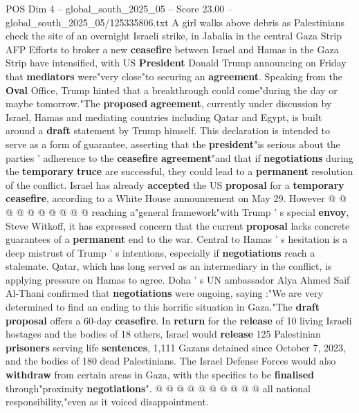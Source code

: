 \begin{textsample}{POS Dim 4 – global\_south\_2025\_05 – Score 23.00 – global\_south\_2025\_05/125335806.txt}  \label{ex:f4_pos_093}
A girl walks above debris as Palestinians check the site of an overnight Israeli strike, in Jabalia in the central Gaza Strip AFP Efforts to broker a new \textbf{ceasefire} between Israel and Hamas in the Gaza Strip have intensified, with US \textbf{President} Donald Trump announcing on Friday that \textbf{mediators} were"very close"to securing an \textbf{agreement}.
Speaking from the \textbf{Oval} Office, Trump hinted that a breakthrough could come"during the day or maybe tomorrow."The \textbf{proposed} \textbf{agreement}, currently under discussion by Israel, Hamas and mediating countries including Qatar and Egypt, is built around a \textbf{draft} statement by Trump himself.
This declaration is intended to serve as a form of guarantee, asserting that the \textbf{president}"is serious about the parties ' adherence to the \textbf{ceasefire} \textbf{agreement}"and that if \textbf{negotiations} during the \textbf{temporary} \textbf{truce} are successful, they could lead to a \textbf{permanent} resolution of the conflict.
Israel has already \textbf{accepted} the US \textbf{proposal} for a \textbf{temporary} \textbf{ceasefire}, according to a White House announcement on May 29.
However @ @ @ @ @ @ @ @ @ @ reaching a"general framework"with Trump ' s special \textbf{envoy}, Steve Witkoff, it has expressed concern that the current \textbf{proposal} lacks concrete guarantees of a \textbf{permanent} end to the war.
Central to Hamas ' s hesitation is a deep mistrust of Trump ' s intentions, especially if \textbf{negotiations} reach a stalemate.
Qatar, which has long served as an intermediary in the conflict, is applying pressure on Hamas to agree.
Doha ' s UN ambassador Alya Ahmed Saif Al-Thani confirmed that \textbf{negotiations} were ongoing, saying :"We are very determined to find an ending to this horrific situation in Gaza."The \textbf{draft} \textbf{proposal} offers a 60-day \textbf{ceasefire}.
In \textbf{return} for the \textbf{release} of 10 living Israeli hostages and the bodies of 18 others, Israel would \textbf{release} 125 Palestinian \textbf{prisoners} serving life \textbf{sentences}, 1,111 Gazans detained since October 7, 2023, and the bodies of 180 dead Palestinians.
The Israel Defense Forces would also \textbf{withdraw} from certain areas in Gaza, with the specifics to be \textbf{finalised} through"proximity \textbf{negotiations}". @ @ @ @ @ @ @ @ @ @ all national responsibility,"even as it voiced disappointment.

\end{textsample}
